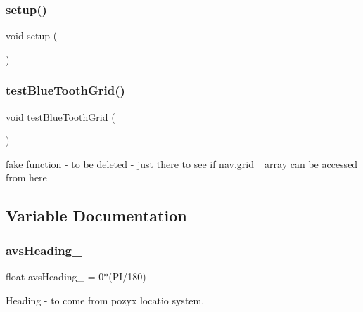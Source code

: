 \mbox{\label{bot_main_8ino_a4fc01d736fe50cf5b977f755b675f11d}} 
\subsubsection{\texorpdfstring{setup()}{setup()}}
{\footnotesize\ttfamily void setup (\begin{DoxyParamCaption}{ }\end{DoxyParamCaption})}

\mbox{\label{bot_main_8ino_a8e570cfb3e7e7e8306ab7c755345c5b8}} 
\subsubsection{\texorpdfstring{test\+Blue\+Tooth\+Grid()}{testBlueToothGrid()}}
{\footnotesize\ttfamily void test\+Blue\+Tooth\+Grid (\begin{DoxyParamCaption}{ }\end{DoxyParamCaption})}



fake function -\/ to be deleted -\/ just there to see if nav.\+grid\+\_\+ array can be accessed from here 



\subsection{Variable Documentation}
\mbox{\label{bot_main_8ino_a26ae4f60d3d4ebfa68763710b6f20e7c}} 
\subsubsection{\texorpdfstring{avs\+Heading\+\_\+}{avsHeading\_}}
{\footnotesize\ttfamily float avs\+Heading\+\_\+ = 0$\ast$(PI/180)}



Heading -\/ to come from pozyx locatio system. 

